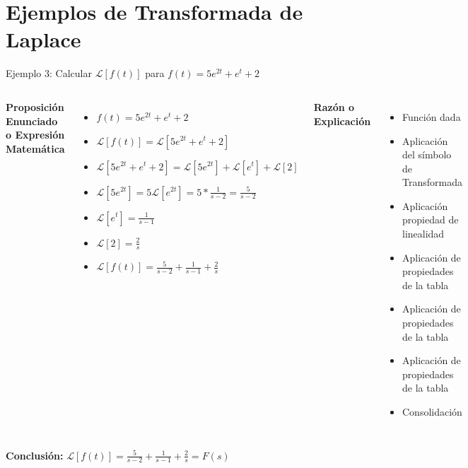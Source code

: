 \documentclass{beamer}
\begin{document}
\section{Ejemplos de Transformada de Laplace}
\begin{frame}{Ejemplo 3: Calcular $\mathcal{L}[f(t)]$ para $f(t)=5e^{2t}+e^{t}+2$}
    \begin{columns}
        \textbf{Proposición Enunciado o Expresión Matemática}
        \begin{itemize}
            \item $f(t)=5e^{2t}+e^{t}+2$ 
            \item $\mathcal{L}[f(t)]=\mathcal{L}[5e^{2t}+e^{t}+2]$ 
            \item $\mathcal{L}[5e^{2t}+e^{t}+2] = \mathcal{L}[5e^{2t}]+\mathcal{L}[e^{t}]+\mathcal{L}[2]$ 
            \item $\mathcal{L}[5e^{2t}]=5\mathcal{L}[e^{2t}]=5*\frac{1}{s-2}=\frac{5}{s-2}$ 
            \item $\mathcal{L}[e^{t}]=\frac{1}{s-1}$ 
            \item $\mathcal{L}[2]=\frac{2}{s}$ 
            \item $\mathcal{L}[f(t)]=\frac{5}{s-2}+\frac{1}{s-1}+\frac{2}{s}$ 
        \end{itemize}
        \textbf{Razón o Explicación}
        \begin{itemize}
            \item Función dada 
            \item Aplicación del símbolo de Transformada 
            \item Aplicación propiedad de linealidad 
            \item Aplicación de propiedades de la tabla 
            \item Aplicación de propiedades de la tabla 
            \item Aplicación de propiedades de la tabla 
            \item Consolidación 
        \end{itemize}
    \end{columns}
    \textbf{Conclusión:} $\mathcal{L}[f(t)]=\frac{5}{s-2}+\frac{1}{s-1}+\frac{2}{s}=F(s)$ 
\end{frame}
\end{document}
